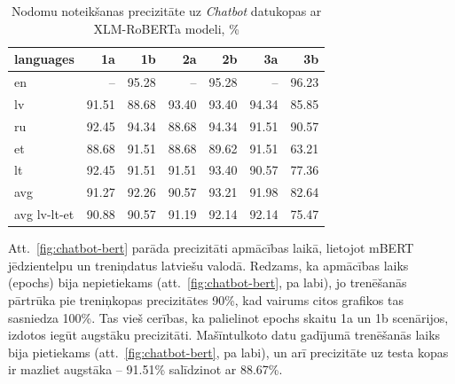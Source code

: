 \begin{table}[htbp]
  \centering
  \caption{Nodomu noteikšanas precizitāte uz \textit{Chatbot} datukopas ar XLM-RoBERTa modeli, \%}
    \begin{tabular}{lrrrrrr} \toprule
    languages & 1a & 1b & 2a & 2b & 3a & 3b \\\midrule
    en    &   --  & \cellcolor[rgb]{ .482,  .631,  .824}95.28 &  --   & \cellcolor[rgb]{ .482,  .631,  .824}95.28 &  --   & \cellcolor[rgb]{ .353,  .541,  .776}96.23 \\
    lv    & \cellcolor[rgb]{ .988,  .988,  1}91.51 & \cellcolor[rgb]{ .984,  .929,  .941}88.68 & \cellcolor[rgb]{ .737,  .812,  .914}93.40 & \cellcolor[rgb]{ .737,  .812,  .914}93.40 & \cellcolor[rgb]{ .608,  .722,  .867}94.34 & \cellcolor[rgb]{ .984,  .871,  .882}85.85 \\
    ru    & \cellcolor[rgb]{ .863,  .902,  .957}92.45 & \cellcolor[rgb]{ .608,  .722,  .867}94.34 & \cellcolor[rgb]{ .984,  .929,  .941}88.68 & \cellcolor[rgb]{ .608,  .722,  .867}94.34 & \cellcolor[rgb]{ .988,  .988,  1}91.51 & \cellcolor[rgb]{ .984,  .969,  .98}90.57 \\
    et    & \cellcolor[rgb]{ .984,  .929,  .941}88.68 & \cellcolor[rgb]{ .988,  .988,  1}91.51 & \cellcolor[rgb]{ .984,  .929,  .941}88.68 & \cellcolor[rgb]{ .984,  .949,  .961}89.62 & \cellcolor[rgb]{ .988,  .988,  1}91.51 & \cellcolor[rgb]{ .973,  .412,  .42}63.21 \\
    lt    & \cellcolor[rgb]{ .863,  .902,  .957}92.45 & \cellcolor[rgb]{ .988,  .988,  1}91.51 & \cellcolor[rgb]{ .988,  .988,  1}91.51 & \cellcolor[rgb]{ .737,  .812,  .914}93.40 & \cellcolor[rgb]{ .984,  .969,  .98}90.57 & \cellcolor[rgb]{ .98,  .698,  .71}77.36 \\\bottomrule
    avg   & 91.27 & 92.26 & 90.57 & 93.21 & 91.98 & 82.64 \\
    avg lv-lt-et & 90.88 & 90.57 & 91.19 & 92.14 & 92.14 & 75.47 \\
    \end{tabular}%
  \label{tab:chatbot-xlm}%
\end{table}%



Att.~\ref{fig:chatbot-bert} parāda precizitāti apmācības laikā, lietojot mBERT jēdzientelpu un treniņdatus latviešu valodā. Redzams, ka apmācības laiks (epochs) bija nepietiekams (att.~\ref{fig:chatbot-bert}, pa labi), jo trenēšanās pārtrūka pie treniņkopas precizitātes 90\%, kad vairums citos grafikos tas sasniedza 100\%. Tas vieš cerības, ka palielinot epochs skaitu 1a un 1b scenārijos, izdotos iegūt augstāku precizitāti. Mašīntulkoto datu gadījumā trenēšanās laiks bija pietiekams (att.~\ref{fig:chatbot-bert}, pa labi), un arī precizitāte uz testa kopas ir mazliet augstāka -- 91.51\% salīdzinot ar 88.67\%.

